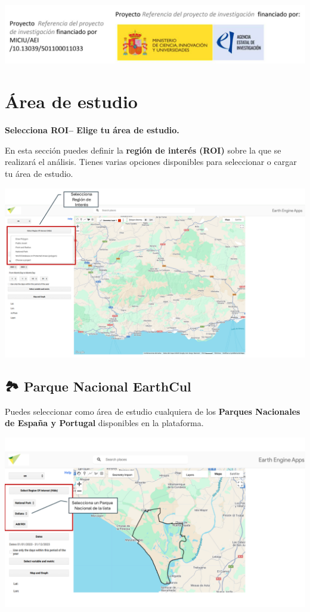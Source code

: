 \documentclass[
]{book}
\begin{document}
\includegraphics{assets/logo.jpeg}

\chapter{Área de estudio}\label{area-estudio}

\textbf{Selecciona ROI-- Elige tu área de estudio.}

En esta sección puedes definir la \textbf{región de interés (ROI)} sobre la que se realizará el análisis. Tienes varias opciones disponibles para seleccionar o cargar tu área de estudio.

\includegraphics{assets/ROI_es.png}

\section{\texorpdfstring{\textbf{🏞️ Parque Nacional EarthCul}}{🏞️ Parque Nacional EarthCul}}\label{parque-nacional-earthcul-1}

Puedes seleccionar como área de estudio cualquiera de los \textbf{Parques Nacionales de España y Portugal} disponibles en la plataforma.

\includegraphics{assets/np_es.png}
\end{document}
